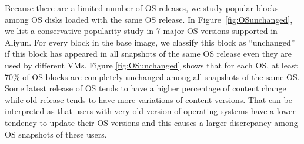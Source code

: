 



Because there are a limited number of OS releases, we study popular blocks among
OS disks loaded with  the same OS release.
In  Figure~\ref{fig:OSunchanged},  we list a conservative  popularity study in 7 major OS versions  supported
in Aliyun.
For every block in the base image, we classify this block as ``unchanged''
if this block has appeared in all snapshots of the same OS release even they are used by different VMs.
Figure \ref{fig:OSunchanged} shows that for each
OS,  at least 70\% of OS blocks are completely unchanged among all snapshots of the same OS.
Some latest release  of OS tends to have a higher percentage of content change
while  old release tends to have more variations of content versions.
That can be interpreted as that users with very old  version of operating systems
have a lower tendency to update their OS versions and this causes a larger discrepancy
among OS snapshots of these users.

